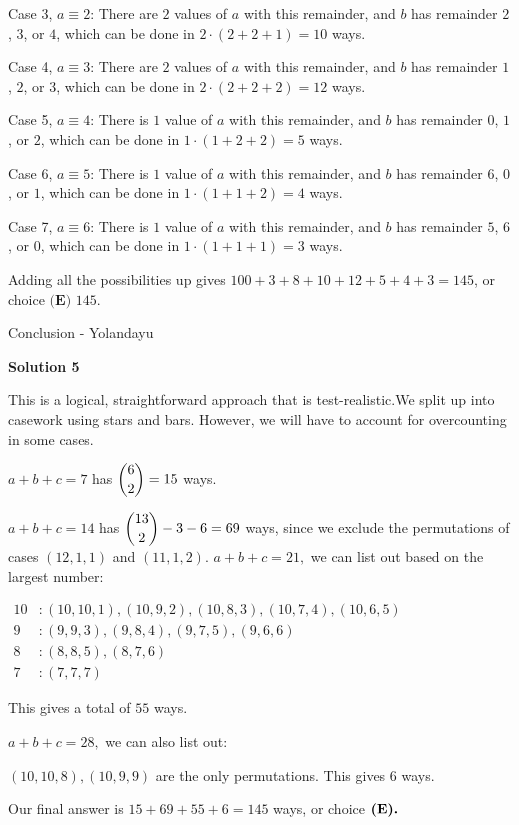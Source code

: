 \begin{enumerate}
 Case 3, $a \equiv 2$: There are $2$ values of $a$ with this remainder, and $b$ has remainder $2$, $3$, or $4$, which can be done in $2 \cdot (2+2+1)=10$ ways.

 Case 4, $a \equiv 3$: There are $2$ values of $a$ with this remainder, and $b$ has remainder $1$, $2$, or $3$, which can be done in $2 \cdot (2+2+2)=12$ ways.

 Case 5, $a \equiv 4$: There is $1$ value of $a$ with this remainder, and $b$ has remainder $0$, $1$, or $2$, which can be done in $1 \cdot (1+2+2)=5$ ways.

 Case 6, $a \equiv 5$: There is $1$ value of $a$ with this remainder, and $b$ has remainder $6$, $0$, or $1$, which can be done in $1 \cdot (1+1+2)=4$ ways.

 Case 7, $a \equiv 6$: There is $1$ value of $a$ with this remainder, and $b$ has remainder $5$, $6$, or $0$, which can be done in $1 \cdot (1+1+1)=3$ ways.

 Adding all the possibilities up gives $100+3+8+10+12+5+4+3=145$, or choice $\boxed{\textbf{(E) }145}$.

 Conclusion - Yolandayu

 



\textbf{Solution 5}

This is a logical, straightforward approach that is test-realistic.We split up into casework using stars and bars. However, we will have to account for overcounting in some cases.

 $a+b+c=7$ has $\dbinom62=15$ ways.

 $a+b+c=14$ has $\dbinom{13}{2}-3-6=69$ ways, since we exclude the permutations of cases $(12,1,1)$ and $(11,1,2).$
$a+b+c=21,$ we can list out based on the largest number:

 $\begin{aligned} 10&: (10,10,1),(10,9,2),(10,8,3),(10,7,4),(10,6,5)\\ 9&: (9,9,3),(9,8,4),(9,7,5),(9,6,6)\\ 8&: (8,8,5),(8,7,6)\\ 7&: (7,7,7) \end{aligned}$

 This gives a total of $55$ ways.

 $a+b+c=28,$ we can also list out:

 $(10,10,8),(10,9,9)$ are the only permutations. This gives $6$ ways.

 Our final answer is $15+69+55+6=\boxed{145}$ ways, or choice $\textbf{\text{(E)}.}$





\end{enumerate}
